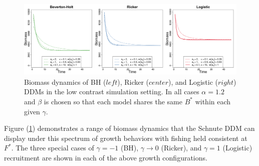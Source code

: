 %
\begin{figure}[h!]
\includegraphics[width=\textwidth]{../ddBias/growthTriptic.png}
\vspace{-0.5cm}
\caption{
Biomass dynamics of BH ($left$), Ricker ($center$), and Logistic ($right$)
DDMs in the low contrast simulation setting. In all cases
$\alpha=1.2$ and $\beta$ is chosen so that each model shares the same
$B^*$ within each given $\gamma$.
}\label{delayTriptic}
\end{figure}
%
Figure (\ref{delayTriptic}) demonstrates a range of biomass dynamics that the Schnute
DDM can display under this spectrum of growth behaviors with fishing held consistent
at $F^*$. The three special cases of $\gamma=-1$ (BH), $\gamma\to0$
(Ricker), and $\gamma=1$ (Logistic) recruitment are shown in each of the above growth configurations.

 

